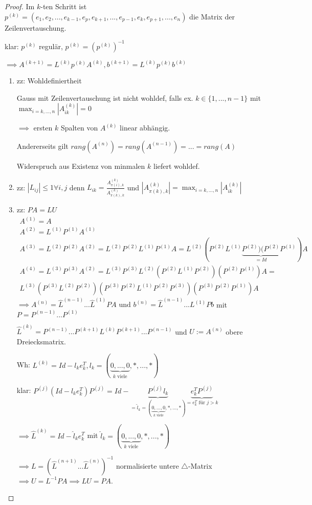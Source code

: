 \begin{proof}
	Im $k$-ten Schritt ist $p^{(k)} = (e_1, e_2, ..., e_{k-1}, e_p, e_{k+1}, ..., e_{p-1}, e_k, e_{p+1}, ..., e_n)$ die Matrix der Zeilenvertauschung.
	
	klar: $p^{(k)}$ regulär, $p^{(k)} = (p^{(k)})^{-1}$
	
	$\implies A^{(k+1)} = L^{(k)} p^{(k)} A^{(k)}, b^{(k+1)} = L^{(k)}p^{(k)}b^{(k)}$
	
	\begin{enumerate}
		\item zz: Wohldefiniertheit
		
		Gauss mit Zeilenvertauschung ist nicht wohldef, falls ex. $k \in \{1, ..., n-1\}$ mit $\max_{i=k,...,n} |A_{ik}^{(k)}| = 0$
		
		$\implies$ ersten $k$ Spalten von $A^{(k)}$ linear abhängig.
		
		Andererseits gilt $rang(A^{(n)}) = rang(A^{(n-1)}) = ... = rang(A)$
		
		Widerspruch aus Existenz von minmalen $k$ liefert wohldef.
		
		\item zz: $|L_{ij}| \leq 1 \forall i,j$ denn $L_{ik} = \frac{A_{\pi(i), k}^{(k)}}{A_{\pi(k),k}^{(k)}}$ und $|A_{\pi(k),k}^{(k)}| = \max_{i=k,...,n}|A_{ik}^{(k)}|$
		
		\item zz: $PA=LU$
		\begin{align*}
			A^{(1)} = A\\
			A^{(2)} = L^{(1)}P^{(1)}A^{(1)}\\
			A^{(3)} = L^{(2)}P^{(2)}A^{(2)} = L^{(2)}P^{(2)}L^{(1)}P^{(1)}A
			= L^{(2)} (P^{(2)} L^{(1)} \underbrace{P^{(2)})(P^{(2)}}_{=Id}P^{(1)})A\\
			A^{(4)} = L^{(3)}P^{(3)}A^{(2)} = L^{(3)}P^{(3)}L^{(2)} (P^{(2)}L^{(1)}P^{(2)})(P^{(2)}P^{(1)})A =\\
			L^{(3)}(P^{(3)}L^{(2)}P^{(2)})(P^{(3)}P^{(2)}L^{(1)}P^{(2)}P^{(3)})(P^{(3)}P^{(2)}P^{(1)})A
		\end{align*}
		$\implies A^{(n)} = \hat{L}^{(n-1)} ... \hat{L}^{(1)}PA \text{ und } b^{(n)} = \hat{L}^{(n-1)} ... L^{(1)}Pb$ mit $P=P^{(n-1)} ... P^{(1)}$
		
		$\hat{L}^{(k)} = P^{(n-1)} ... P^{(k+1)}L^{(k)}P^{(k+1)}...P^{(n-1)}$ und $U := A^{(n)}$ obere Dreiecksmatrix.
		
		Wh: $L^{(k)} = Id - l_ke_k^T, l_k=(\underbrace{0, ..., 0}_{k\text{ viele}}, *, ..., *)$
		
		klar: $P^{(j)}(Id - l_ke_k^T)P^{(j)} = Id - \underbrace{P^{(j)}l_k}_{=\tilde{l}_k = (\underbrace{0, ..., 0}_{k\text{ viele}}, *, ..., *)} \underbrace{e_k^TP^{(j)}}_{=e_k^T \text{ für } j> k}$
		
		$\implies \hat{L}^{(k)} = Id - \hat{l}_k e_k^T$ mit $\hat{l}_k = (\underbrace{0, ..., 0}_{k\text{ viele}}, *, ..., *)$
		
		$\implies L=(\hat{L}^{(n+1)} ... \hat{L}^{(n)})^{-1}$ normalisierte untere $\triangle$-Matrix $\implies U = L^{-1}PA \implies LU=PA$.
	\end{enumerate}
\end{proof}

